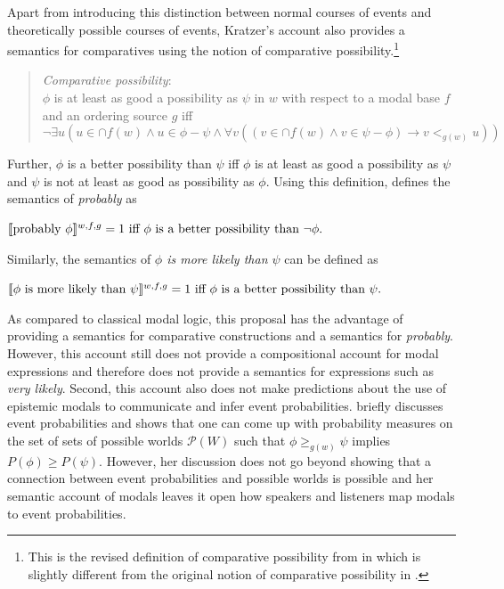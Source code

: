 Apart from introducing this distinction between normal courses of events and theoretically possible courses of events, Kratzer's account also
provides a semantics for comparatives using the notion of comparative possibility.\footnote{This is the revised definition of comparative possibility from
in \cite{Kratzer2012Ch2} which is slightly different from the original notion of comparative possibility in \cite{Kratzer1981}.}
\begin{quote}
\noindent \textit{Comparative possibility}: \\
$\phi$ is at least as good a possibility as $\psi$ in $w$ with respect to a modal base $f$ and an ordering source $g$ iff 
$$\lnot \exists u ( u \in \cap f(w) \land u \in \phi-\psi \land \forall v (( v \in \cap f(w) \land v \in \psi-\phi) \rightarrow v <_{g(w)} u))$$
\end{quote}
\noindent	Further, $\phi$ is a better possibility than $\psi$ iff $\phi$ is at least as good a  possibility as $\psi$ and $\psi$ is 
not at least as good as possibility as $\phi$. Using this definition, \cite{Kratzer1991} defines the semantics of \textit{probably} as
\begin{exe}
\ex $\llbracket\mbox{probably } \phi\rrbracket^{w,f,g}  = 1 \mbox{ iff $\phi$ is a better possibility than $\lnot \phi$}.$ 
\end{exe}
\noindent Similarly, the semantics of \textit{$\phi$ is more likely than $\psi$} can be defined as 
\begin{exe}
\ex $\llbracket\phi \mbox{ is more likely than } \psi\rrbracket^{w,f,g}  = 1 \mbox{ iff $\phi$ is a better possibility than $\psi$}.$ 
\end{exe}	

As compared to classical modal logic, this proposal has the advantage of providing a semantics for comparative constructions and
a semantics for \textit{probably}. However, this account still does not provide a compositional account for modal expressions and 
therefore does not provide a semantics for expressions such as \textit{very likely}. Second, this account also does not make predictions
about the use of epistemic modals to communicate and infer event probabilities. \cite{Kratzer2012} briefly discusses event probabilities and shows that one
can come up with probability measures on the set of sets of possible worlds $\mathcal{P}(W)$ such that $\phi \ge_{g(w)} \psi$ implies $P(\phi) \ge P(\psi)$. 
However, her discussion does not go beyond showing that a connection between event probabilities and possible worlds is possible and 
her semantic account of modals leaves it open how speakers and listeners map modals to event probabilities.

